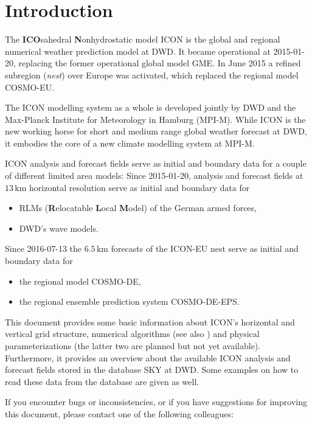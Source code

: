 \chapter{Introduction}

The \textbf{ICO}sahedral \textbf{N}onhydrostatic model ICON is the global and regional numerical 
weather prediction model at DWD. It became operational at 2015-01-20, replacing the former  
operational global model GME. 
In June 2015 a refined subregion (\emph{nest}) over Europe was activated, which  
replaced the regional model COSMO-EU.

The ICON modelling system as a whole is developed jointly by DWD and the Max-Planck Institute 
for Meteorology in Hamburg (MPI-M). While ICON is the new working horse for short and medium range 
global weather forecast at DWD, it embodies the core of a new climate modelling system at MPI-M.

ICON analysis and forecast fields serve as initial and boundary data for a couple of different 
limited area models:
Since 2015-01-20, analysis and forecast fields at $13\,\mathrm{km}$ horizontal resolution 
serve as initial and boundary data for
\begin{itemize}
 \item RLMs (\textbf{R}elocatable \textbf{L}ocal \textbf{M}odel) of the German armed forces,
 \item DWD's wave models.
\end{itemize}
Since 2016-07-13 the $6.5\,\mathrm{km}$ forecasts of the ICON-EU nest serve as initial and 
boundary data for
\begin{itemize}
 \item the regional model COSMO-DE,
 \item the regional ensemble prediction system COSMO-DE-EPS.
\end{itemize}

This document provides some basic information about ICON's horizontal and vertical grid structure, 
numerical algorithms (see also \cite{Zaengl15}) and physical parameterizations (the latter two are 
planned but not yet available). Furthermore, it provides an overview about the available ICON analysis 
and forecast fields stored in the database SKY at DWD. Some examples on how to read these data from 
the database are given as well.

\vfill
If you encounter bugs or inconsistencies, or if you have suggestions for improving this document, 
please contact one of the following colleagues:

